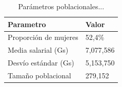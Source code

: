 \begin{table}

\caption{\label{tab:table-pop-params}Parámetros poblacionales...}
\centering
\begin{tabular}[t]{ll}
\toprule
Parametro & Valor\\
\midrule
Proporción de mujeres & 52,4\%\\
Media salarial (Gs) & 7,077,586\\
Desvío estándar (Gs) & 5,153,750\\
Tamaño poblacional & 279,152\\
\bottomrule
\end{tabular}
\end{table}
